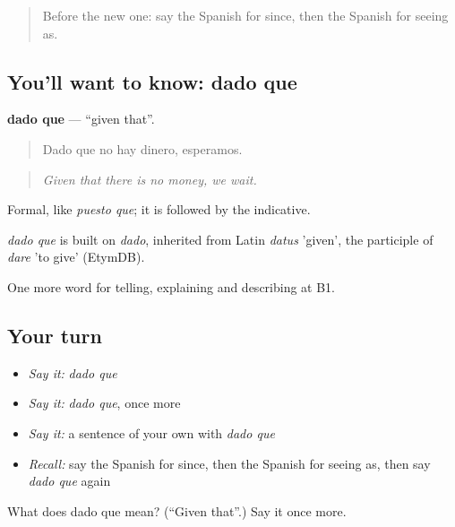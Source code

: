 \label{lesson:ES-C580-dado-que}



\begin{quote}
Before the new one: say the Spanish for since, then the Spanish for seeing as.
\end{quote}

\subsection*{You'll want to know: dado que}
\textbf{dado que} — \textquotedblleft{}given that\textquotedblright{}.

\begin{quote}
Dado que no hay dinero, esperamos.
\end{quote}

\begin{quote}
\emph{Given that there is no money, we wait.}
\end{quote}

Formal, like \emph{puesto que}; it is followed by the indicative.

\begin{cousinweb}
\emph{dado que} is built on \emph{dado}, inherited from Latin \emph{datus} 'given', the participle of \emph{dare} 'to give' (EtymDB).
\end{cousinweb}

\begin{grammarlens}[title={What you've built}]
One more word for telling, explaining and describing at B1.
\end{grammarlens}

\subsection*{Your turn}
\begin{itemize}
\raggedright
  \item \emph{Say it:} \emph{dado que}
  \item \emph{Say it:} \emph{dado que}, once more
  \item \emph{Say it:} a sentence of your own with \emph{dado que}
  \item \emph{Recall:} say the Spanish for since, then the Spanish for seeing as, then say \emph{dado que} again
\end{itemize}

\begin{tcolorbox}[breakable,colback=teal!4,colframe=teal!35!black,title={Before you move on}]
What does dado que mean? (\textquotedblleft{}Given that\textquotedblright{}.) Say it once more.
\end{tcolorbox}
